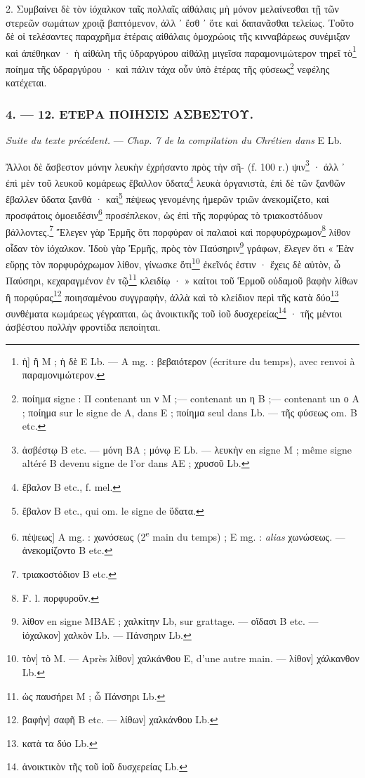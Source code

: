 \documentclass[a4paper, 11pt, oneside, polutonikogreek, french]{article}
\begin{document}
2. Συμβαίνει δὲ τὸν ἰόχαλκον ταῖς πολλαῖς αἰθάλαις μὴ μόνον μελαίνεσθαι τῇ τῶν στερεῶν σωμάτων χροιᾷ βαπτόμενον, ἀλλ ᾽ ἔσθ ᾽ ὅτε καὶ δαπανᾶσθαι τελείως. Τοῦτο δὲ οἱ τελέσαντες παραχρῆμα ἑτέραις αἰθάλαις ὁμοχρώοις τῆς κινναβάρεως συνέμιξαν καὶ ἀπέθηκαν · ἡ αἰθάλη τῆς ὑδραργύρου αἰθάλῃ μιγεῖσα παραμονιμώτερον τηρεῖ τὸ\footnote{ἡ] ἢ M ; ἡ δὲ E Lb. --- A mg. : βεβαιότερον (écriture du temps), avec renvoi à παραμονιμώτερον.} ποίημα τῆς ὑδραργύρου · καὶ πάλιν τάχα οὖν ὑπὸ ἑτέρας τῆς φύσεως\footnote{ποίημα signe : Π contenant un ν M ;--- contenant un η B ;--- contenant un ο A ; ποίημα sur le signe de A, dans E ; ποίημα seul dans Lb. --- τῆς φύσεως om. B etc.} νεφέλης κατέχεται.

\bigskip
\centerline{\EightStarTaper}
\centerline{\EightStarTaper\EightStarTaper}
\bigskip

\subsubsection{4. --- 12. ΕΤΕΡΑ ΠΟΙΗΣΙΣ ΑΣΒΕΣΤΟΥ.}

\emph{Suite du texte précédent.} --- \emph{Chap. 7 de la compilation du Chrétien dans} E Lb.

\bigskip

Ἄλλοι δὲ ἄσβεστον μόνην λευκὴν ἐχρήσαντο πρὸς τὴν σῆ- (f. 100 r.) ψιν\footnote{ἀσβέστῳ B etc. --- μόνη BA ; μόνῳ E Lb. --- λευκὴν en signe M ; même signe altéré B devenu signe de l'or dans AE ; χρυσοῦ Lb.} · ἀλλ ᾽ ἐπὶ μὲν τοῦ λευκοῦ κομάρεως ἔβαλλον ὕδατα\footnote{ἔβαλον B etc., f. mel.} λευκὰ ὀργανιστὰ, ἐπὶ δὲ τῶν ξανθῶν ἔβαλλεν ὕδατα ξανθά · καὶ\footnote{ἔβαλον B etc., qui om. le signe de ὕδατα.} πέψεως γενομένης ἡμερῶν τριῶν ἀνεκομίζετο, καὶ προσφάτοις ὁμοειδέσιν\footnote{πέψεως] A mg. : χωνόσεως (2\textsuperscript{e} main du temps) ; E mg. : \emph{alias} χωνώσεως. --- ἀνεκομίζοντο B etc.} προσέπλεκον, ὡς ἐπὶ τῆς πορφύρας τὸ τριακοστόδυον βάλλοντες.\footnote{τριακοστόδιον B etc.} Ἔλεγεν γὰρ Ἑρμῆς ὅτι πορφύραν οἱ παλαιοὶ καὶ πορφυρόχρωμον\footnote{F. l. πορφυροῦν.} λίθον οἶδαν τὸν ἰόχαλκον. Ἰδοὺ γὰρ Ἑρμῆς, πρὸς τὸν Παύσηριν\footnote{λίθον en signe MBAE ; χαλκίτην Lb, sur grattage. --- οἴδασι B etc. --- ἰόχαλκον] χαλκὸν Lb. --- Πάνσηριν Lb.} γράφων, ἔλεγεν ὅτι « Ἐὰν εὕρῃς τὸν πορφυρόχρωμον λίθον, γίνωσκε ὅτι\footnote{τὸν] τὸ M. --- Après λίθον] χαλκάνθου E, d'une autre main. --- λίθον] χάλκανθον Lb.} ἐκεῖνός ἐστιν · ἔχεις δὲ αὐτὸν, ὦ Παύσηρι, κεχαραγμένον ἐν τῷ\footnote{ὡς παυσήρει M ; ὦ Πάνσηρι Lb.} κλειδίῳ · » καίτοι τοῦ Ἑρμοῦ οὐδαμοῦ βαφὴν λίθων ἢ πορφύρας\footnote{βαφὴν] σαφῆ B etc. --- λίθων] χαλκάνθου Lb.} ποιησαμένου συγγραφὴν, ἀλλὰ καὶ τὸ κλείδιον περὶ τῆς κατὰ δύο\footnote{κατὰ τα δύο Lb.} συνθέματα κωμάρεως γέγραπται, ὡς ἀνοικτικῆς τοῦ ἰοῦ δυσχερείας\footnote{ἀνοικτικὸν τῆς τοῦ ἰοῦ δυσχερείας Lb.} · τῆς μέντοι ἀσβέστου πολλὴν φροντίδα πεποίηται.
\clearpage
\bigskip
\centerline{\EightStarTaper}
\centerline{\EightStarTaper\EightStarTaper}
\bigskip
\end{document}
